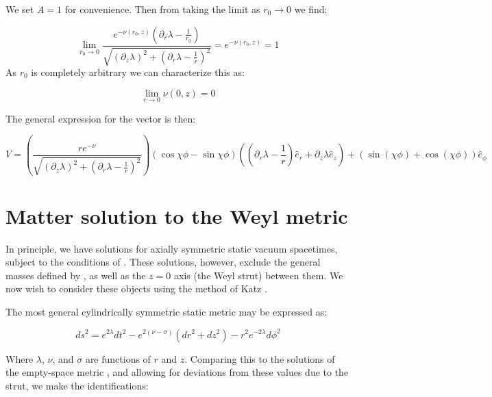 \documentclass{article}
\begin{document}
We set $A=1$ for convenience. Then from  taking
the limit as $r_0\rightarrow 0$ we find:

\begin{equation}
  \label{eq:limit-r->0}
  \lim_{r_0\rightarrow 0} \frac{e^{-\nu(r_0,z)}(\partial_r\lambda-\frac{1}{r_0})}{\sqrt{\left(\partial_z\lambda\right)^2+\left(\partial_r\lambda-\frac{1}{r}\right)^2}}=e^{-\nu(r_0,z)}=1
\end{equation}
As $r_0$ is completely arbitrary we can characterize this as:

\begin{equation}
  \label{eq:nu-elem-flat}
  \lim_{r\rightarrow 0}\nu(0,z)=0
\end{equation}

The general expression for the vector is then:

\begin{equation}
\label{eq:v-from-par-transport}
V=\left(\frac{r e^{-\nu}}{\sqrt{\left(\partial_z\lambda\right)^2+\left(\partial_r\lambda-\frac{1}{r}\right)^2}}\right)\left(\cos\chi\phi-\sin\chi\phi\right)\left(\left(\partial_r\lambda-\frac{1}{r}\right)\hat{e}_{r}+\partial_z\lambda\hat{e}_{z}\right)+\left(\sin(\chi\phi)+\cos(\chi\phi)\right)\hat{e}_{\phi}
\end{equation}

\section{Matter solution to the Weyl metric}
\label{sec:matter-solution}

In principle, we have solutions for axially symmetric static vacuum spacetimes, subject to the conditions of . These solutions, however, exclude the general masses defined by , as well as the $z=0$ axis (the Weyl strut) between them. We now wish to consider these objects using the method of Katz \cite{katz1967derivation}. 

The most general cylindrically symmetric static metric may be expressed as:

\begin{equation}
ds^{2}=e^{2\lambda}dt^{2}-e^{2\left(\nu-\sigma\right)}\left(dr^{2}+dz^{2}\right)-r^{2}e^{-2\lambda}d\phi^{2}
\label{eq:weyl-metric}
\end{equation}

Where $\lambda$, $\nu$, and $\sigma$ are functions of $r$ and $z$. Comparing this to the solutions of the empty-space metric , and allowing for deviations from these values due to the strut, we make the identifications:
\end{document}
